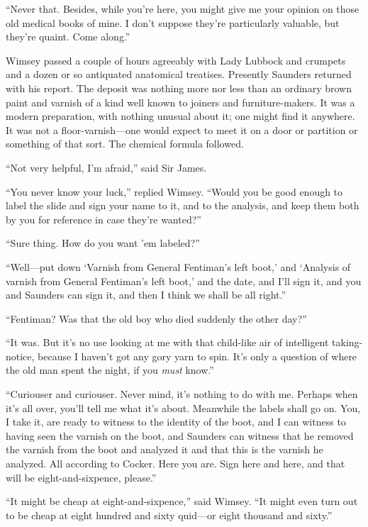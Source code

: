 \enquote{Never that. Besides, while you're here, you might give me your opinion on those old medical books of mine. I don't suppose they're particularly valuable, but they're quaint. Come along.}

Wimsey passed a couple of hours agreeably with Lady Lubbock and crumpets and a dozen or so antiquated anatomical treatises. Presently Saunders returned with his report. The deposit was nothing more nor less than an ordinary brown paint and varnish of a kind well known to joiners and furniture-makers. It was a modern preparation, with nothing unusual about it; one might find it anywhere. It was not a floor-varnish\allowbreak---\allowbreak one would expect to meet it on a door or partition or something of that sort. The chemical formula followed.

\enquote{Not very helpful, I'm afraid,} said Sir James.

\enquote{You never know your luck,} replied Wimsey. \enquote{Would you be good enough to label the slide and sign your name to it, and to the analysis, and keep them both by you for reference in case they're wanted?}

\enquote{Sure thing. How do you want 'em labeled?}

\enquote{Well\allowbreak---\allowbreak put down \enquote{Varnish from General Fentiman's left boot,} and \enquote{Analysis of varnish from General Fentiman's left boot,} and the date, and I'll sign it, and you and Saunders can sign it, and then I think we shall be all right.}

\enquote{Fentiman? Was that the old boy who died suddenly the other day?}

\enquote{It was. But it's no use looking at me with that child-like air of intelligent taking-notice, because I haven't got any gory yarn to spin. It's only a question of where the old man spent the night, if you \textit{must} know.}

\enquote{Curiouser and curiouser. Never mind, it's nothing to do with me. Perhaps when it's all over, you'll tell me what it's about. Meanwhile the labels shall go on. You, I take it, are ready to witness to the identity of the boot, and I can witness to having seen the varnish on the boot, and Saunders can witness that he removed the varnish from the boot and analyzed it and that this is the varnish he analyzed. All according to Cocker. Here you are. Sign here and here, and that will be eight-and-sixpence, please.}

\enquote{It might be cheap at eight-and-sixpence,} said Wimsey. \enquote{It might even turn out to be cheap at eight hundred and sixty quid\allowbreak---\allowbreak or eight thousand and sixty.}

